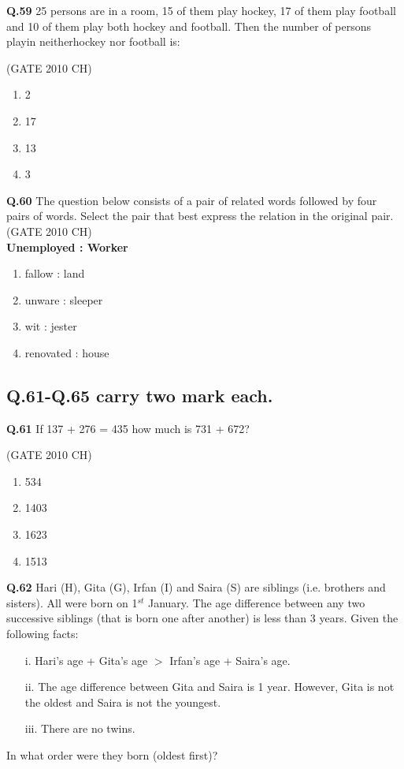 \documentclass[journal,12pt,onecolumn]{exam}
\theoremstyle{remark}
\begin{document}
\noindent
\textbf{Q.59}
 25 persons are in a room, 15 of them play hockey, 17 of them play football and 10 of them play both hockey and football. Then the number of persons playin neitherhockey nor football is:

 \hfill{(GATE 2010 CH)}\\

 \begin{enumerate}
     \item 2
     \item 17
     \item 13
     \item 3
     
 \end{enumerate}

\noindent
\textbf{Q.60}
  The question below consists of a pair of related words followed by four pairs of words. Select the pair that best express the relation in the original pair.\\
 
  \hfill{(GATE 2010 CH)}\\
  
  \textbf{Unemployed : Worker}

\begin{enumerate}
    \item fallow : land
    \item unware : sleeper
    \item wit : jester
    \item renovated : house
\end{enumerate}

\subsection{Q.61-Q.65 carry two mark each.}

\noindent
\textbf{Q.61}
 If 137 + 276 = 435 how much is 731 + 672?

\hfill{(GATE 2010 CH)}\\

 \begin{enumerate}
     \item 534
     \item 1403
     \item 1623
     \item 1513
 \end{enumerate}

\noindent
\textbf{Q.62}
 Hari (H), Gita (G), Irfan (I) and Saira (S) are siblings (i.e. brothers and sisters). All were born on 1$^{st}$ January. The age difference between any two successive siblings (that is born one after another) is less than 3 years. Given the following facts:\\
\begin{itemize}
    \item[i.] Hari's age + Gita's age $>$ Irfan's age + Saira's age.
    \item[ii.] The age difference between Gita and Saira is 1 year. However, Gita is not the oldest and Saira is not the youngest.
    \item[iii.] There are no twins.
\end{itemize}
In what order were they born (oldest first)?\\
\end{document}
